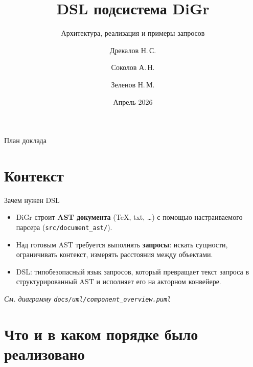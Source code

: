 \documentclass[aspectratio=169,11pt]{beamer}
\title{DSL подсистема DiGr}
\subtitle{Архитектура, реализация и примеры запросов}
\author{Дрекалов Н.\,С. \and Соколов А.\,Н. \and Зеленов Н.\,М.}
\date{Апрель 2026}
\newcommand{\uml}[1]{\textit{См. диаграмму \texttt{docs/uml/#1}}}
\begin{document}
\begin{frame}
  \titlepage
\end{frame}

\begin{frame}{План доклада}
  \tableofcontents
\end{frame}

\section{Контекст}

\begin{frame}{Зачем нужен DSL}
  \begin{itemize}
    \item DiGr строит \textbf{AST документа} (TeX, txt, \dots) с помощью настраиваемого
          парсера (\texttt{src/document\_ast/}).
    \item Над готовым AST требуется выполнять \textbf{запросы}: искать сущности,
          ограничивать контекст, измерять расстояния между объектами.
    \item DSL: типобезопасный язык запросов, который превращает текст запроса
          в структурированный AST и исполняет его на акторном конвейере.
  \end{itemize}
  \vspace{0.5em}
  \uml{component\_overview.puml}
\end{frame}

\section{Что и в каком порядке было реализовано}
\end{document}
